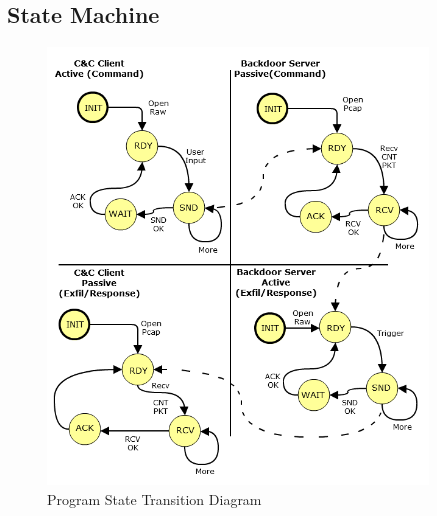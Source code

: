 \documentclass[titlepage]{article}
\begin{document}
\subsection{State Machine}

\begin{figure}[htb]                                                                       
  \begin{center}
    \includegraphics[width=0.9\textwidth]{imgs/std.png}
  \end{center}
  \caption{Program State Transition Diagram}
  \label{fig:std}
\end{figure}
\end{document}
